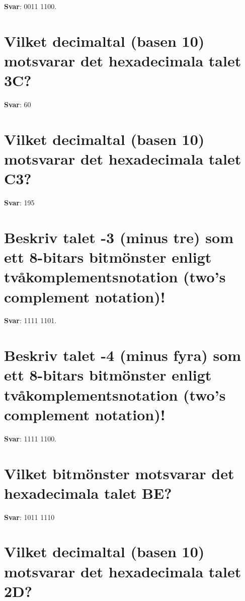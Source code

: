 \documentclass[a4paper,11pt,oneside]{book}
\begin{document}
\begin{sloppypar}
\label{q:389:sa:sv:True}

\textbf{Svar}: 0011 1100.



\section{Vilket decimaltal (basen 10) motsvarar det hexadecimala talet 3C?}

\label{q:390:sa:sv:True}

\textbf{Svar}: 60



\section{Vilket decimaltal (basen 10) motsvarar det hexadecimala talet C3?}

\label{q:391:sa:sv:True}

\textbf{Svar}: 195



\section{Beskriv talet -3 (minus tre) som ett 8-bitars bitm\"onster enligt tv\r{a}komplementsnotation (two{\textquoteright}s complement notation)!}

\label{q:392:sa:sv:True}

\textbf{Svar}: 1111 1101.



\section{Beskriv talet -4 (minus fyra) som ett 8-bitars bitm\"onster enligt tv\r{a}komplementsnotation (two{\textquoteright}s complement notation)!}

\label{q:393:sa:sv:True}

\textbf{Svar}: 1111 1100.



\section{Vilket bitm\"onster motsvarar det hexadecimala talet BE?}

\label{q:394:sa:sv:True}

\textbf{Svar}: 1011 1110



\section{Vilket decimaltal (basen 10) motsvarar det hexadecimala talet 2D?}


\end{sloppypar}
\end{document}
